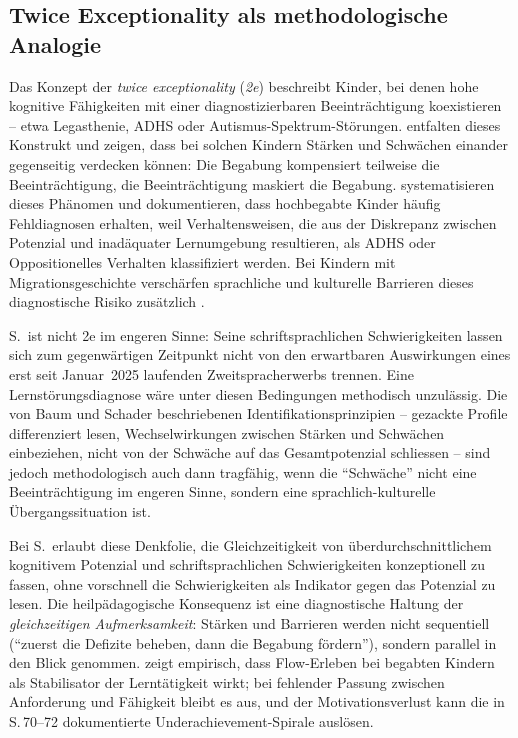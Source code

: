 \documentclass[ngerman, a4paper]{article}
\begin{document}
\subsection{Twice Exceptionality als methodologische Analogie}
\label{subsec:2e}

Das Konzept der \textit{twice exceptionality} (\textit{2e}) beschreibt
Kinder, bei denen hohe kognitive Fähigkeiten mit einer diagnostizierbaren
Beeinträchtigung koexistieren -- etwa Legasthenie, ADHS oder
Autismus-Spektrum-Störungen.
\textcite[S.\,588--600]{baumschader2021twice} entfalten dieses Konstrukt
und zeigen, dass bei solchen Kindern Stärken und Schwächen einander
gegenseitig verdecken können: Die Begabung kompensiert teilweise die
Beeinträchtigung, die Beeinträchtigung maskiert die Begabung.
\textcite[S.\,87--94]{webb2020doppeldiagnosen} systematisieren dieses
Phänomen und dokumentieren, dass hochbegabte Kinder häufig Fehldiagnosen
erhalten, weil Verhaltensweisen, die aus der Diskrepanz zwischen Potenzial
und inadäquater Lernumgebung resultieren, als ADHS oder Oppositionelles
Verhalten klassifiziert werden. Bei Kindern mit Migrationsgeschichte
verschärfen sprachliche und kulturelle Barrieren dieses diagnostische
Risiko zusätzlich \parencite[S.\,576--587]{stamm2021fehlenderblick}.

S.\ ist nicht 2e im engeren Sinne: Seine schriftsprachlichen
Schwierigkeiten lassen sich zum gegenwärtigen Zeitpunkt nicht von den
erwartbaren Auswirkungen eines erst seit Januar~2025 laufenden
Zweitspracherwerbs trennen. Eine Lernstörungsdiagnose wäre unter diesen
Bedingungen methodisch unzulässig. Die von Baum und Schader beschriebenen
Identifikationsprinzipien -- gezackte Profile differenziert lesen,
Wechselwirkungen zwischen Stärken und Schwächen einbeziehen, nicht von der
Schwäche auf das Gesamtpotenzial schliessen -- sind jedoch methodologisch
auch dann tragfähig, wenn die \enquote{Schwäche} nicht eine
Beeinträchtigung im engeren Sinne, sondern eine sprachlich-kulturelle
Übergangssituation ist.

Bei S.\ erlaubt diese Denkfolie, die Gleichzeitigkeit von
überdurchschnittlichem kognitivem Potenzial und schriftsprachlichen
Schwierigkeiten konzeptionell zu fassen, ohne vorschnell die Schwierigkeiten
als Indikator gegen das Potenzial zu lesen. Die heilpädagogische Konsequenz
ist eine diagnostische Haltung der \textit{gleichzeitigen Aufmerksamkeit}:
Stärken und Barrieren werden nicht sequentiell (\enquote{zuerst die Defizite
beheben, dann die Begabung fördern}), sondern parallel in den Blick
genommen. \textcite[S.\,84--89]{lehwald2017motivation} zeigt empirisch,
dass Flow-Erleben bei begabten Kindern als Stabilisator der Lerntätigkeit
wirkt; bei fehlender Passung zwischen Anforderung und Fähigkeit bleibt es
aus, und der Motivationsverlust kann die in
S.\,70--72 dokumentierte Underachievement-Spirale auslösen.
\end{document}
